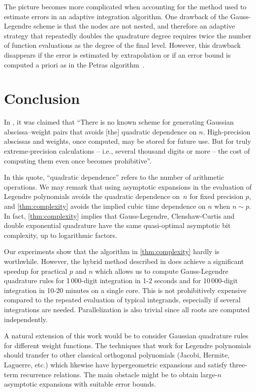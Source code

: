 \documentclass[nohypdvips,review]{siamart0216}
\begin{document}
The picture becomes more complicated when accounting for the method
used to estimate errors in an adaptive integration algorithm.
One drawback of the Gauss-Legendre scheme is that the nodes
are not nested, and therefore an adaptive strategy that
repeatedly doubles the quadrature degree
requires twice the number of function evaluations as
the degree of the final level.
However, this drawback disappears if the
error is estimated by extrapolation or if an error bound is computed
a priori as in the Petras algorithm~\cite{petras2002self}.

\section{Conclusion}

In \cite{bailey2011high}, it was claimed that
``There is no known scheme for generating Gaussian abscissa--weight pairs
that avoids [the] quadratic dependence
on $n$. High-precision abscissas
and weights, once computed, may be stored for future use. But for truly
extreme-precision calculations -- i.e., several thousand digits or
more -- the cost of computing them
even once becomes prohibitive''.

In this quote, ``quadratic dependence'' refers to the number of arithmetic operations.
We may remark that using asymptotic expansions in the
evaluation of Legendre polynomials avoids the quadratic
dependence on~$n$ for fixed precision $p$, and \cref{thm:complexity}
avoids the implied cubic time dependence on $n$ when $n \sim p$.
In fact, \cref{thm:complexity} implies that
Gauss-Legendre, Clenshaw-Curtis and double exponential
quadrature have the same quasi-optimal asymptotic bit complexity,
up to logarithmic factors.

Our experiments show that the algorithm in \cref{thm:complexity}
hardly is worthwhile. However, the hybrid method described in
 does achieve a
significant speedup for practical $p$ and $n$
which allows us to compute Gauss-Legendre quadrature rules for
1\,000-digit integration in 1-2 seconds and for 10\,000-digit integration in 10-20 minutes
on a single core. This is not prohibitively
expensive compared to the repeated evaluation
of typical integrands, especially if several integrations are needed.
Parallelization is also trivial since all roots
are computed independently.

A natural extension of this work would be to
consider Gaussian quadrature rules for different
weight functions.
The techniques that work for Legendre polynomials should transfer to other
classical orthogonal polynomials (Jacobi, Hermite, Laguerre, etc.)
which likewise have hypergeometric expansions
and satisfy three-term recurrence relations.
The main obstacle might be
to obtain large-$n$ asymptotic expansions with suitable error bounds.
\end{document}
